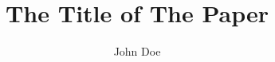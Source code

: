 \documentclass[english]{article}
\begin{document}
\title{The Title of The Paper}
\author{John Doe}
\maketitle
\end{document}
